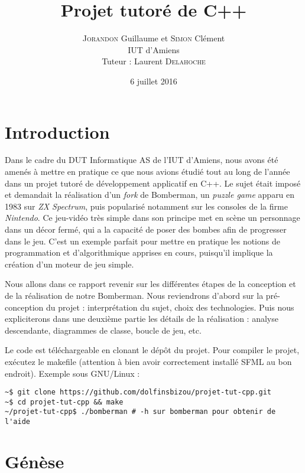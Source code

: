 \documentclass[a4paper,10pt]{report}
\title{Projet tutoré de C++}
\author{\textsc{Jorandon} Guillaume et \textsc{Simon} Clément\\\normalsize{IUT d'Amiens}\\\normalsize{Tuteur : Laurent \textsc{Delahoche}}}
\date{6 juillet 2016}
\begin{document}
\maketitle

\tableofcontents

\chapter*{Introduction}
Dans le cadre du DUT Informatique AS de l'IUT d'Amiens, nous avons été amenés à mettre en pratique ce que nous avions étudié tout au long de l'année dans un projet tutoré de développement applicatif en C++. Le sujet était imposé et demandait la réalisation d'un \textit{fork} de Bomberman, un \textit{puzzle game} apparu en 1983 sur \textit{ZX Spectrum}, puis popularisé notamment sur les consoles de la firme \textit{Nintendo}. Ce jeu-vidéo très simple dans son principe met en scène un personnage dans un décor fermé, qui a la capacité de poser des bombes afin de progresser dans le jeu. C'est un exemple parfait pour mettre en pratique les notions de programmation et d'algorithmique apprises en cours, puisqu'il implique la création d'un moteur de jeu simple.

Nous allons dans ce rapport revenir sur les différentes étapes de la conception et de la réalisation de notre Bomberman. Nous reviendrons d'abord sur la pré-conception du projet : interprétation du sujet, choix des technologies. Puis nous expliciterons dans une deuxième partie les détails de la réalisation : analyse descendante, diagrammes de classe, boucle de jeu, etc.

Le code est téléchargeable en clonant le dépôt du projet. Pour compiler le projet, exécutez le makefile (attention à bien avoir correctement installé SFML au bon endroit). Exemple sous GNU/Linux :
\begin{lstlisting}
~$ git clone https://github.com/dolfinsbizou/projet-tut-cpp.git
~$ cd projet-tut-cpp && make
~/projet-tut-cpp$ ./bomberman # -h sur bomberman pour obtenir de l'aide
\end{lstlisting}

\chapter{Génèse}
\end{document}
